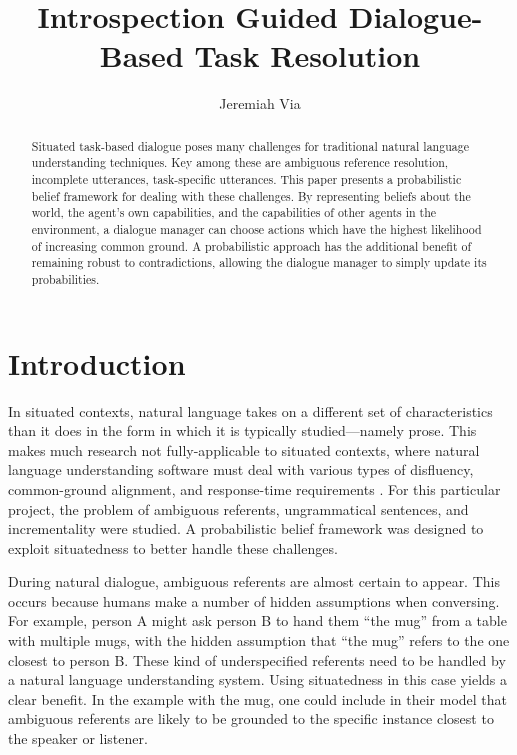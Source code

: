\documentclass[12pt]{article}
\title{Introspection Guided Dialogue-Based Task Resolution}
\author{Jeremiah Via}
\begin{document}
\maketitle

\begin{abstract}
  Situated task-based dialogue poses many challenges for traditional
  natural language understanding techniques. Key among these are
  ambiguous reference resolution, incomplete utterances, task-specific
  utterances. This paper presents a probabilistic belief framework for
  dealing with these challenges. By representing beliefs about the
  world, the agent's own capabilities, and the capabilities of other
  agents in the environment, a dialogue manager can choose actions
  which have the highest likelihood of increasing common ground. A
  probabilistic approach has the additional benefit of remaining
  robust to contradictions, allowing the dialogue manager to simply
  update its probabilities.
\end{abstract}

\section{Introduction}
\label{sec:intro}
In situated contexts, natural language takes on a different set of
characteristics than it does in the form in which it is typically
studied---namely prose. This makes much research not fully-applicable
to situated contexts, where natural language understanding software
must deal with various types of disfluency, common-ground alignment,
and response-time requirements \cite{Scheutz2011:dialogue}. For this
particular project, the problem of ambiguous referents, ungrammatical
sentences, and incrementality were studied. A probabilistic belief
framework was designed to exploit situatedness to better handle these
challenges.

During natural dialogue, ambiguous referents are almost certain to
appear. This occurs because humans make a number of hidden assumptions
when conversing. For example, person A might ask person B to hand them
``the mug'' from a table with multiple mugs, with the hidden
assumption that ``the mug'' refers to the one closest to person
B. These kind of underspecified referents need to be handled by a
natural language understanding system. Using situatedness in this case
yields a clear benefit. In the example with the mug, one could include
in their model that ambiguous referents are likely to be grounded to
the specific instance closest to the speaker or listener.
\end{document}
